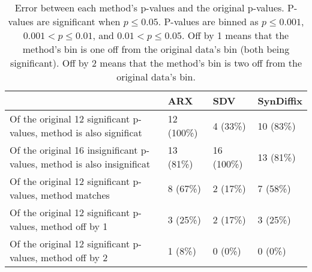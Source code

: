 
      \setlength{\fboxsep}{0pt}
      \begin{table}
      \begin{center}
      \begin{small}
      \begin{tabular}{llll}
      \toprule
        & ARX & SDV & SynDiffix \\
      \midrule
        Of the original 12 significant p-values, method is also significat  & 12 (100\%)  & 4 (33\%)  & 10 (83\%)  \\ 
    Of the original 16 insignificant p-values, method is also insignificat  & 13 (81\%)  & 16 (100\%)  & 13 (81\%)  \\ 
    Of the original 12 significant p-values, method matches  & 8 (67\%)  & 2 (17\%)  & 7 (58\%)  \\ 
    Of the original 12 significant p-values, method off by 1  & 3 (25\%)  & 2 (17\%)  & 3 (25\%)  \\ 
    Of the original 12 significant p-values, method off by 2  & 1 (8\%)  & 0 (0\%)  & 0 (0\%)  \\ 

      \bottomrule
      \end{tabular}
      \end{small}
      \caption{Error between each method's p-values and the original p-values. P-values are significant when $p \leq 0.05$. P-values are binned as $p \leq 0.001$, $0.001 < p \leq 0.01$, and $0.01 < p \leq 0.05$. Off by 1 means that the method's bin is one off from the original data's bin (both being significant). Off by 2 means that the method's bin is two off from the original data's bin.
      }
      \label{tab:p_table}
      \end{center}
      \end{table}
      \setlength{\fboxsep}{3pt}
    